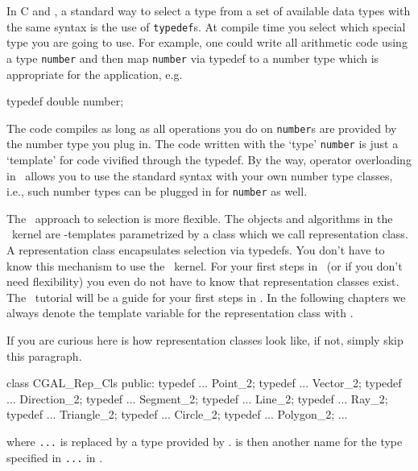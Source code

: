 In C and \CC, a standard way to select a type from a set 
of available data types with the same syntax is the use of 
{\tt typedef}s. At compile time you select which special type 
you are going to use. For example, one could write all arithmetic 
code using a type {\tt number} and then map {\tt number} via
typedef to a number type which is appropriate for the application,
e.g.

\begin{cprog}

typedef    double     number;

\end{cprog}

The code compiles as long as all operations you do on {\tt number}s
are provided by the number type you plug in.
The code written with the `type' {\tt number} is just a `template'
for code vivified through the typedef.
By the way, operator overloading
in \CC\ allows you to use the standard syntax with your own
number type classes, i.e., such number types can be plugged in
for {\tt number} as well.

The \cgal\ approach to selection is more flexible. 
The objects and algorithms in the \cgal\ kernel are \CC -templates
parametrized by a class which we call representation class.
A representation class encapsulates selection via typedefs.
You don't have to know this mechanism to use the \cgal\ kernel.
For your first steps in \cgal\ (or if you don't need flexibility)
you even do not have to know that representation classes exist.
The \cgal\ tutorial will be a guide for your first steps in \cgal.
In the following
chapters we always denote the template variable for the representation
class with .

If you are curious here is how representation classes
look like, if not, simply skip this paragraph.

\begin{cprog}
class CGAL_Rep_Cls
{
public:
    typedef ...   Point_2;
    typedef ...   Vector_2;
    typedef ...   Direction_2;
    typedef ...   Segment_2;
    typedef ...   Line_2;
    typedef ...   Ray_2;
    typedef ...   Triangle_2;
    typedef ...   Circle_2;
    typedef ...   Polygon_2;
    ...
}
\end{cprog}

%
\gdef\CCfont{\tt}
\gdef\CCendfont{}
where {\tt ...} is replaced by a type provided by \cgal.
 is then another name for the type specified in
{\tt ...} in .
\gdef\CCfont{\it}
\gdef\CCendfont{}

